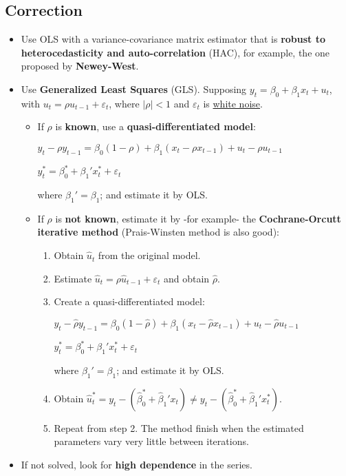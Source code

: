 \documentclass[10pt, a4paper, landscape]{extarticle}
\begin{document}
\begin{multicols}{3}
\subsection*{Correction}

\begin{itemize}[leftmargin=*]
	\item Use OLS with a variance-covariance matrix estimator that is \textbf{robust to heterocedasticity and auto-correlation} (HAC), for example, the one proposed by \textbf{Newey-West}.
	\item Use \textbf{Generalized Least Squares} (GLS). Supposing $y_t = \beta_0 + \beta_1 x_t + u_t$, with $u_t = \rho u_{t - 1} + \varepsilon_t$, where $\lvert \rho \rvert < 1$ and $\varepsilon_t$ is \underline{white noise}.
	\begin{itemize}[leftmargin=*]
		\item If $\rho$ is \textbf{known}, use a \textbf{quasi-differentiated model}:
		\begin{center}
			$y_t - \rho y_{t - 1} = \beta_0 (1 - \rho) + \beta_1 (x_t - \rho x_{t - 1}) + u_t - \rho u_{t - 1}$
			
			$y_t^* = \beta_0^* + \beta_1' x_t^* + \varepsilon_t$
		\end{center}
		where $\beta_1' = \beta_1$; and estimate it by OLS.
		\item If $\rho$ is \textbf{not known}, estimate it by -for example- the \textbf{Cochrane-Orcutt iterative method} (Prais-Winsten method is also good):
		\begin{enumerate}[leftmargin=*]
			\item Obtain $\hat{u}_t$ from the original model.
			\item Estimate $\hat{u}_t = \rho \hat{u}_{t-1} + \varepsilon_t$ and obtain $\hat{\rho}$.
			\item Create a quasi-differentiated model:
			\begin{center}
				$y_t - \hat{\rho} y_{t - 1} = \beta_0 (1 - \hat{\rho}) + \beta_1 (x_t - \hat{\rho} x_{t - 1}) + u_t - \hat{\rho} u_{t - 1}$
				
				$y_t^* = \beta_0^* + \beta_1' x_t^* + \varepsilon_t$
			\end{center}
			where $\beta_1' = \beta_1$; and estimate it by OLS.
			\item Obtain $\hat{u}_t^* = y_t - (\hat{\beta}_0^* + \hat{\beta}_1' x_t) \neq y_t - (\hat{\beta}_0^* + \hat{\beta}_1' x_t^*)$.
			\item Repeat from step 2. The method finish when the estimated parameters vary very little between iterations.
		\end{enumerate}
	\end{itemize}
	\item If not solved, look for \textbf{high dependence} in the series.
\end{itemize}


\end{multicols}
\end{document}

